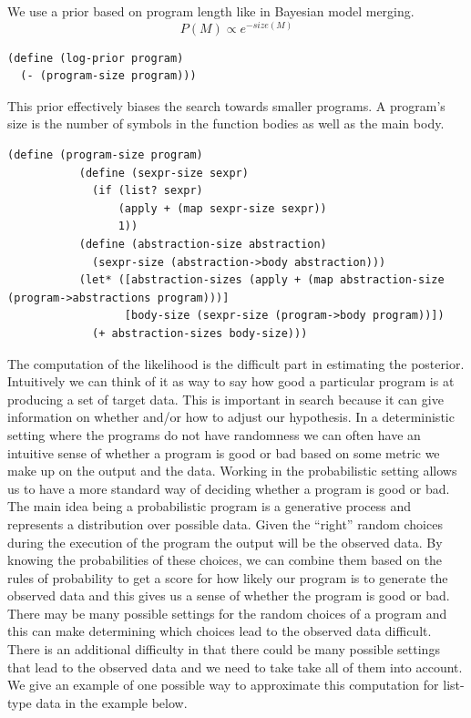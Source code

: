 \documentclass[a4paper,10pt]{article}
\begin{document}
We use a prior based on program length like in Bayesian model merging.  
\begin{equation}P(M)\propto e^{-size(M)}\end{equation}
\begin{lstlisting}[frame=trBL]
(define (log-prior program)
  (- (program-size program)))
\end{lstlisting}
This prior effectively biases the search towards smaller programs.  A program's size is the number of symbols in the function bodies as well as the main body.
\begin{lstlisting}[frame=trBL]
(define (program-size program)
           (define (sexpr-size sexpr)
             (if (list? sexpr)
                 (apply + (map sexpr-size sexpr))
                 1))
           (define (abstraction-size abstraction)
             (sexpr-size (abstraction->body abstraction)))
           (let* ([abstraction-sizes (apply + (map abstraction-size (program->abstractions program)))]
                  [body-size (sexpr-size (program->body program))])
             (+ abstraction-sizes body-size)))
\end{lstlisting}
The computation of the likelihood is the difficult part in estimating the posterior.  Intuitively we can think of it as way to say how good a particular program is at producing a set of target data.  This is important in search because it can give information on whether and/or how to adjust our hypothesis.  In a deterministic setting where the programs do not have randomness we can often have an intuitive sense of whether a program is good or bad based on some metric we make up on the output and the data.  Working in the probabilistic setting allows us to have a more standard way of deciding whether a program is good or bad.  The main idea being a probabilistic program is a generative process and represents a distribution over possible data.  Given the ``right'' random choices during the execution of the program the output will be the observed data.  By knowing the probabilities of these choices, we can combine them based on the rules of probability to get a score for how likely our program is to generate the observed data and this gives us a sense of whether the program is good or bad.  There may be many possible settings for the random choices of a program and this can make determining which choices lead to the observed data difficult.  There is an additional difficulty in that there could be many possible settings that lead to the observed data and we need to take take all of them into account.  We give an example of one possible way to approximate this computation for list-type data in the example below.
\end{document}
